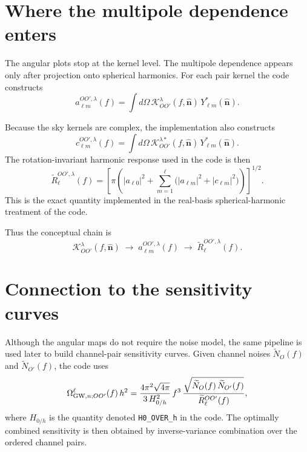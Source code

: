 \documentclass[11pt]{article}
\begin{document}
\section{Where the multipole dependence enters}

The angular plots stop at the kernel level.
The multipole dependence appears only after projection onto spherical harmonics.
For each pair kernel the code constructs
\begin{equation}
a^{OO',\lambda}_{\ell m}(f)
=
\int d\Omega\,
\mathcal K^\lambda_{OO'}(f,\hat{\bm n})\,
Y_{\ell m}^*(\hat{\bm n}).
\end{equation}

Because the sky kernels are complex, the implementation also constructs
\begin{equation}
c^{OO',\lambda}_{\ell m}(f)
=
\int d\Omega\,
\mathcal K^{\lambda *}_{OO'}(f,\hat{\bm n})\,
Y_{\ell m}^*(\hat{\bm n}).
\end{equation}
The rotation-invariant harmonic response used in the code is then
\begin{equation}
\widetilde R^{OO',\lambda}_\ell(f)
=
\left[
\pi
\left(
|a_{\ell 0}|^2
+
\sum_{m=1}^{\ell}
\big(
|a_{\ell m}|^2 + |c_{\ell m}|^2
\big)
\right)
\right]^{1/2}.
\end{equation}
This is the exact quantity implemented in the real-basis spherical-harmonic treatment of the code.

Thus the conceptual chain is
\begin{equation}
\mathcal K^\lambda_{OO'}(f,\hat{\bm n})
\;\longrightarrow\;
a^{OO',\lambda}_{\ell m}(f)
\;\longrightarrow\;
\widetilde R^{OO',\lambda}_\ell(f).
\end{equation}

\section{Connection to the sensitivity curves}

Although the angular maps do not require the noise model, the same pipeline is used later to build channel-pair sensitivity curves.
Given channel noises $\widetilde N_O(f)$ and $\widetilde N_{O'}(f)$, the code uses
\begin{equation}
\Omega_{{\rm GW},n;OO'}^\ell(f)\,h^2
=
\frac{4\pi^2\sqrt{4\pi}}{3\,H_{0/h}^2}\,
f^3\,
\frac{\sqrt{\widetilde N_O(f)\,\widetilde N_{O'}(f)}}{\widetilde R^{OO'}_\ell(f)},
\end{equation}
where $H_{0/h}$ is the quantity denoted \texttt{H0\_OVER\_h} in the code.
The optimally combined sensitivity is then obtained by inverse-variance combination over the ordered channel pairs.
\end{document}
